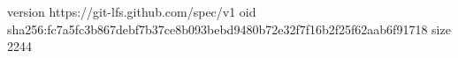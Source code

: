 version https://git-lfs.github.com/spec/v1
oid sha256:fc7a5fc3b867debf7b37ce8b093bebd9480b72e32f7f16b2f25f62aab6f91718
size 2244
